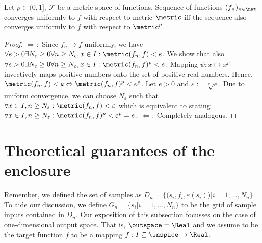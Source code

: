 \begin{lem}\label{lem:hoeldermetricconv}
Let $p \in  (0,1]$, $\mathcal F$ be a metric space of functions. Sequence of functions $(f_n)_{n \in \nat}$ converges uniformly to $f$ with respect to metric $\metric$ iff the sequence also converges uniformly to $f$ with respect to $\metric^p$.


\begin{proof} $\Rightarrow:$
Since $f_n \to f$ uniformly, we have 
$\forall e >0 \exists N_e \geq 0 \forall n \geq N_e, x \in I : \metric(f_n , f) < e$. We show that also $\forall e >0 \exists N_e \geq 0 \forall n \geq N_e, x \in I : \metric(f_n , f)^p < e$.
Mapping $\psi: x \mapsto x^p$ invectively maps positive numbers onto the set of positive real numbers. Hence, $\metric(f_n, f) < e \Leftrightarrow \metric(f_n , f)^p < e^p$.
Let $e >0$ and $ \varepsilon := \sqrt[p]{e}$. Due to uniform convergence, we can choose $ N_\varepsilon$ such that $\forall x \in I, n \geq N_\varepsilon: \metric(f_n , f) <\varepsilon$ which is equivalent to stating $\forall x \in I, n \geq N_\varepsilon: \metric(f_n , f)^p <\varepsilon^p = e$. $\Leftarrow:$ Completely analogous.
\end{proof}  
\end{lem}




\section{Theoretical guarantees of the enclosure}

 Remember, we defined the set of samples as $D_n= \{\bigl( s_i, \tilde f_i, \varepsilon(s_i) \bigr) \vert i=1,\ldots, N_n \} $. To aide our discussion, we define $G_n =\{s_i | i =1,\ldots,N_n\}$ to be the grid of sample inputs contained in $D_n$.
Our exposition of this subsection focusses on the case of one-dimensional output space. That is, $\outspace = \Real$ and we assume to be the target function $f$ to be a mapping $f: I \subseteq \inspace \to \Real$.


